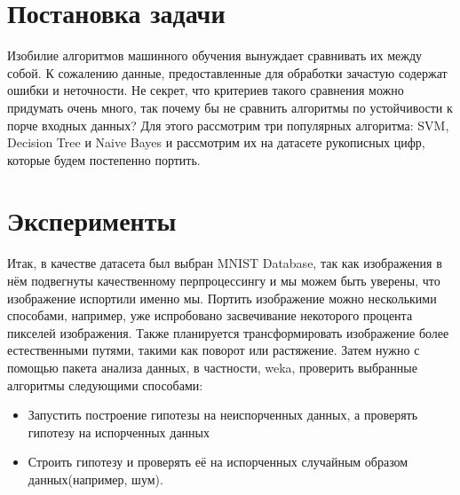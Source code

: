 \documentclass{article}
\begin{document}
\section{Постановка задачи}
Изобилие алгоритмов машинного обучения вынуждает сравнивать их между собой. К сожалению данные, предоставленные для обработки зачастую содержат ошибки и неточности. Не секрет, что критериев такого сравнения можно придумать очень много, так почему бы не сравнить алгоритмы по устойчивости к порче входных данных? Для этого рассмотрим три популярных алгоритма: SVM, Decision Tree и Naive Bayes и рассмотрим их на датасете рукописных цифр, которые будем постепенно портить.
\section{Эксперименты}
Итак, в качестве датасета был выбран MNIST Database, так как изображения в нём подвегнуты качественному перпроцессингу и мы можем быть уверены, что изображение испортили именно мы. Портить изображение можно несколькими способами, например, уже испробовано засвечивание некоторого процента пикселей изображения. Также планируется трансформировать изображение более естественными путями, такими как поворот или растяжение. Затем нужно с помощью пакета анализа данных, в частности, weka, проверить выбранные алгоритмы следующими способами:
\begin{itemize}
\item Запустить построение гипотезы на неиспорченных данных, а проверять гипотезу на испорченных данных
\item Строить гипотезу и проверять её на испорченных случайным образом данных(например, шум). 
\end{itemize}
\end{document}

